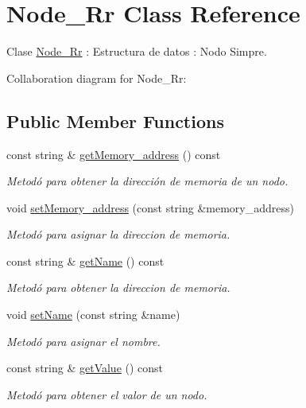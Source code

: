 \hypertarget{classNode__Rr}{}\section{Node\+\_\+\+Rr Class Reference}
\label{classNode__Rr}


Clase \hyperlink{classNode__Rr}{Node\+\_\+\+Rr} \+: Estructura de datos \+: Nodo Simpre.  




Collaboration diagram for Node\+\_\+\+Rr\+:
\subsection*{Public Member Functions}
\begin{DoxyCompactItemize}
\item 
const string \& \hyperlink{classNode__Rr_a8dfecf52b5c100649e5c4c6bb5fd5c47}{get\+Memory\+\_\+address} () const 
\begin{DoxyCompactList}\small\item\em Metodó para obtener la dirección de memoria de un nodo. \end{DoxyCompactList}\item 
void \hyperlink{classNode__Rr_addf93ef5a830ead0e94f1df8fb61aace}{set\+Memory\+\_\+address} (const string \&memory\+\_\+address)
\begin{DoxyCompactList}\small\item\em Metodó para asignar la direccion de memoria. \end{DoxyCompactList}\item 
const string \& \hyperlink{classNode__Rr_a713a7f0e0b6c05622d73f525a6baa97a}{get\+Name} () const 
\begin{DoxyCompactList}\small\item\em Metodó para obtener la direccion de memoria. \end{DoxyCompactList}\item 
void \hyperlink{classNode__Rr_a59d78cd74c4f6cd8514378bc500d546d}{set\+Name} (const string \&name)
\begin{DoxyCompactList}\small\item\em Metodó para asignar el nombre. \end{DoxyCompactList}\item 
const string \& \hyperlink{classNode__Rr_a4b39555fecab1aa0cc8fa32a96c6ec1d}{get\+Value} () const 
\begin{DoxyCompactList}\small\item\em Metodó para obtener el valor de un nodo. \end{DoxyCompactList}\item 

\end{DoxyCompactItemize}
